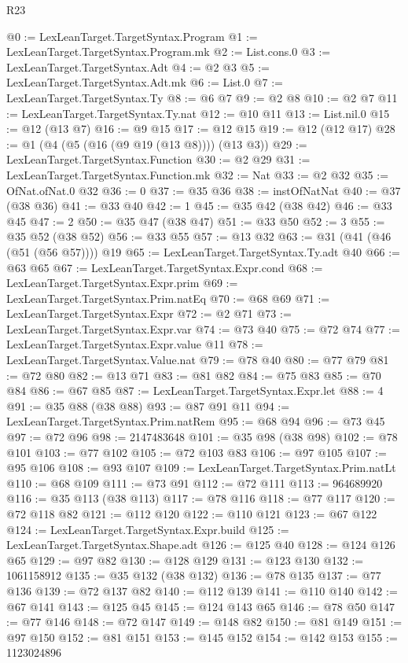 \begin{lexlean}{R23}
\begin{coremodule}
@0 := LexLeanTarget.TargetSyntax.Program
@1 := LexLeanTarget.TargetSyntax.Program.mk
@2 := List.cons.{0}
@3 := LexLeanTarget.TargetSyntax.Adt
@4 := @2 @3
@5 := LexLeanTarget.TargetSyntax.Adt.mk
@6 := List.{0}
@7 := LexLeanTarget.TargetSyntax.Ty
@8 := @6 @7
@9 := @2 @8
@10 := @2 @7
@11 := LexLeanTarget.TargetSyntax.Ty.nat
@12 := @10 @11
@13 := List.nil.{0}
@15 := @12 (@13 @7)
@16 := @9 @15
@17 := @12 @15
@19 := @12 (@12 @17)
@28 := @1 (@4 (@5 (@16 (@9 @19 (@13 @8)))) (@13 @3))
@29 := LexLeanTarget.TargetSyntax.Function
@30 := @2 @29
@31 := LexLeanTarget.TargetSyntax.Function.mk
@32 := Nat
@33 := @2 @32
@35 := OfNat.ofNat.{0} @32
@36 := 0
@37 := @35 @36
@38 := instOfNatNat
@40 := @37 (@38 @36)
@41 := @33 @40
@42 := 1
@45 := @35 @42 (@38 @42)
@46 := @33 @45
@47 := 2
@50 := @35 @47 (@38 @47)
@51 := @33 @50
@52 := 3
@55 := @35 @52 (@38 @52)
@56 := @33 @55
@57 := @13 @32
@63 := @31 (@41 (@46 (@51 (@56 @57)))) @19
@65 := LexLeanTarget.TargetSyntax.Ty.adt @40
@66 := @63 @65
@67 := LexLeanTarget.TargetSyntax.Expr.cond
@68 := LexLeanTarget.TargetSyntax.Expr.prim
@69 := LexLeanTarget.TargetSyntax.Prim.natEq
@70 := @68 @69
@71 := LexLeanTarget.TargetSyntax.Expr
@72 := @2 @71
@73 := LexLeanTarget.TargetSyntax.Expr.var
@74 := @73 @40
@75 := @72 @74
@77 := LexLeanTarget.TargetSyntax.Expr.value @11
@78 := LexLeanTarget.TargetSyntax.Value.nat
@79 := @78 @40
@80 := @77 @79
@81 := @72 @80
@82 := @13 @71
@83 := @81 @82
@84 := @75 @83
@85 := @70 @84
@86 := @67 @85
@87 := LexLeanTarget.TargetSyntax.Expr.let
@88 := 4
@91 := @35 @88 (@38 @88)
@93 := @87 @91 @11
@94 := LexLeanTarget.TargetSyntax.Prim.natRem
@95 := @68 @94
@96 := @73 @45
@97 := @72 @96
@98 := 2147483648
@101 := @35 @98 (@38 @98)
@102 := @78 @101
@103 := @77 @102
@105 := @72 @103 @83
@106 := @97 @105
@107 := @95 @106
@108 := @93 @107
@109 := LexLeanTarget.TargetSyntax.Prim.natLt
@110 := @68 @109
@111 := @73 @91
@112 := @72 @111
@113 := 964689920
@116 := @35 @113 (@38 @113)
@117 := @78 @116
@118 := @77 @117
@120 := @72 @118 @82
@121 := @112 @120
@122 := @110 @121
@123 := @67 @122
@124 := LexLeanTarget.TargetSyntax.Expr.build
@125 := LexLeanTarget.TargetSyntax.Shape.adt
@126 := @125 @40
@128 := @124 @126 @65
@129 := @97 @82
@130 := @128 @129
@131 := @123 @130
@132 := 1061158912
@135 := @35 @132 (@38 @132)
@136 := @78 @135
@137 := @77 @136
@139 := @72 @137 @82
@140 := @112 @139
@141 := @110 @140
@142 := @67 @141
@143 := @125 @45
@145 := @124 @143 @65
@146 := @78 @50
@147 := @77 @146
@148 := @72 @147
@149 := @148 @82
@150 := @81 @149
@151 := @97 @150
@152 := @81 @151
@153 := @145 @152
@154 := @142 @153
@155 := 1123024896

\end{coremodule}
\end{lexlean}
